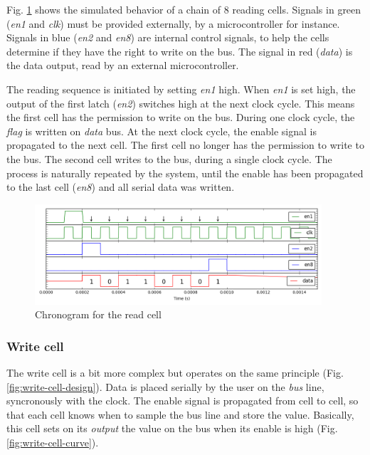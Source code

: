 Fig. \ref{fig:read-cell-curve} shows the simulated behavior of a chain of 8 reading cells.
Signals in green (\textit{en1} and \textit{clk}) must be provided externally, by a microcontroller for instance.
Signals in blue (\textit{en2} and \textit{en8}) are internal control signals, to help the cells determine if they have the right to write on the bus.
The signal in red (\textit{data}) is the data output, read by an external microcontroller.

The reading sequence is initiated by setting \textit{en1} high.
When \textit{en1} is set high, the output of the first latch (\textit{en2}) switches high at the next clock cycle.
This means the first cell has the permission to write on the bus.
During one clock cycle, the \textit{flag} is written on \textit{data} bus.
At the next clock cycle, the enable signal is propagated to the next cell.
The first cell no longer has the permission to write to the bus.
The second cell writes to the bus, during a single clock cycle.
The process is naturally repeated by the system, until the enable has been propagated to the last cell (\textit{en8}) and all serial data was written.

\begin{figure}[!h]
  \centering
  \includegraphics[width=0.95\textwidth]{src/3/figures/curve_read_cell.png}
  \caption{Chronogram for the read cell}
  \label{fig:read-cell-curve}
\end{figure}

\subsubsection{Write cell}

The write cell is a bit more complex but operates on the same principle (Fig. \ref{fig:write-cell-design}).
Data is placed serially by the user on the \textit{bus} line, syncronously with the clock.
The enable signal is propagated from cell to cell, so that each cell knows when to sample the bus line and store the value.
Basically, this cell sets on its \textit{output} the value on the bus when its enable is high (Fig. \ref{fig:write-cell-curve}).

